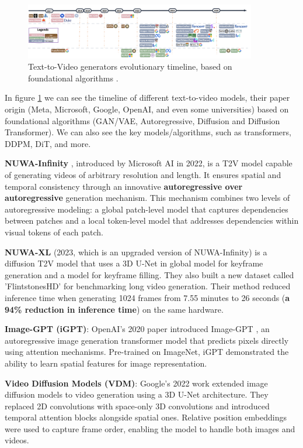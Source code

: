 \begin{figure}
    \centering
    \includegraphics[width=0.9\textwidth]{images/video_synthesis/timeline.png}
    \caption{Text-to-Video generators evolutionary timeline, based on foundational algorithms \cite{sun2024sora}.}
    \label{fig:video_synthesis_timeline}
\end{figure}

In figure \ref{fig:video_synthesis_timeline} we can see the timeline of different text-to-video models, their paper origin (Meta, Microsoft, Google, OpenAI, and even some universities) based on foundational algorithms (GAN/VAE, Autoregressive, Diffusion and Diffusion Transformer). We can also see the key models/algorithms, such as transformers, DDPM, DiT, and more.

\textbf{NUWA-Infinity } \cite{nuwa_infinity}, introduced by Microsoft AI in 2022, is a T2V model capable of generating videos of arbitrary resolution and length. It ensures spatial and temporal consistency through an innovative \textbf{autoregressive over autoregressive} generation mechanism. This mechanism combines two levels of autoregressive modeling: a global patch-level model that captures dependencies between patches and a local token-level model that addresses dependencies within visual tokens of each patch.

\textbf{NUWA-XL} \cite{nuwa_xl} (2023, which is an upgraded version of NUWA-Infinity) is a diffusion T2V model that uses a 3D U-Net in global model for keyframe generation and a model for keyframe filling. They also built a new dataset called 'FlintstonesHD' for benchmarking long video generation. Their method reduced inference time when generating 1024 frames from 7.55 minutes to 26 seconds (\textbf{a 94\% reduction in inference time}) on the same hardware.

\textbf{Image-GPT (iGPT)}: OpenAI's 2020 paper introduced Image-GPT \cite{imagegpt}, an autoregressive image generation transformer model that predicts pixels directly using attention mechanisms. Pre-trained on ImageNet, iGPT demonstrated the ability to learn spatial features for image representation.

\textbf{Video Diffusion Models (VDM)}: Google's 2022 work \cite{video_diffusion_models} extended image diffusion models to video generation using a 3D U-Net architecture. They replaced 2D convolutions with space-only 3D convolutions and introduced temporal attention blocks alongside spatial ones. Relative position embeddings were used to capture frame order, enabling the model to handle both images and videos.

